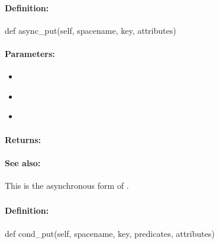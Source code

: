 \paragraph{Definition:}
\begin{pythoncode}
def async_put(self, spacename, key, attributes)
\end{pythoncode}

\paragraph{Parameters:}
\begin{itemize}[noitemsep]
\item {}\\

\item {}\\

\item {}\\

\end{itemize}

\paragraph{Returns:}


\paragraph{See also:}  This is the asynchronous form of .

\pagebreak
\subsubsection{}
\label{api:python:cond_put}


\paragraph{Definition:}
\begin{pythoncode}
def cond_put(self, spacename, key, predicates, attributes)
\end{pythoncode}

